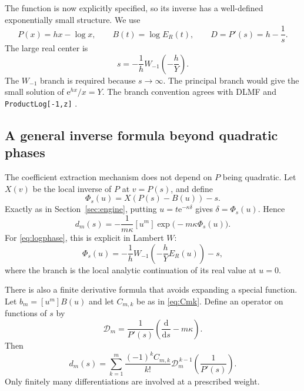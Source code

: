 \documentclass[11pt]{article}
\numberwithin{equation}{section}
\theoremstyle{definition}
\newcommand{\ee}{\mathrm e}
\newcommand{\dd}{\mathrm d}
\begin{document}
The function is now explicitly specified, so its inverse has a well-defined exponentially small structure. We use
\begin{equation}\label{eq:logphase}
 P(x)=hx-\log x,\qquad B(t)=\log E_R(t),\qquad
 D=P'(s)=h-\frac1s.
\end{equation}
The large real center is
\begin{equation}\label{eq:Wcenter}
 \boxed{\displaystyle
 s=-\frac1h W_{-1}\!\left(-\frac hY\right).}
\end{equation}
The $W_{-1}$ branch is required because $s\to\infty$. The principal branch would give the small solution of $\ee^{hx}/x=Y$. The branch convention agrees with DLMF and \texttt{ProductLog[-1,z]} \cite{dlmfW,wolframW}.

\subsection{A general inverse formula beyond quadratic phases}

The coefficient extraction mechanism does not depend on $P$ being quadratic. Let $X(v)$ be the local inverse of $P$ at $v=P(s)$, and define
\begin{equation}\label{eq:generalPhi}
 \Phi_s(u)=X(P(s)-B(u))-s.
\end{equation}
Exactly as in Section~\ref{sec:engine}, putting
$u=t\ee^{-\kappa\delta}$ gives $\delta=\Phi_s(u)$. Hence
\begin{equation}\label{eq:general-inverse-extraction}
 d_m(s)=-\frac1{m\kappa}[u^m]\exp\bigl(-m\kappa\Phi_s(u)\bigr).
\end{equation}
For \eqref{eq:logphase}, this is explicit in Lambert $W$:
\begin{equation}\label{eq:W-Phi}
 \Phi_s(u)=-\frac1h W_{-1}\!\left(-\frac hY E_R(u)\right)-s,
\end{equation}
where the branch is the local analytic continuation of its real value at $u=0$.

There is also a finite derivative formula that avoids expanding a special function. Let $b_m=[u^m]B(u)$ and let $C_{m,k}$ be as in \eqref{eq:Cmk}. Define an operator on functions of $s$ by
\begin{equation}\label{eq:shiftedoperator}
 \mathcal D_m=\frac1{P'(s)}\left(\frac{\dd}{\dd s}-m\kappa\right).
\end{equation}
Then
\begin{equation}\label{eq:general-derivative}
 \boxed{\displaystyle
 d_m(s)=\sum_{k=1}^m\frac{(-1)^kC_{m,k}}{k!}
             \mathcal D_m^{\,k-1}\left(\frac1{P'(s)}\right).}
\end{equation}
Only finitely many differentiations are involved at a prescribed weight.
\end{document}
